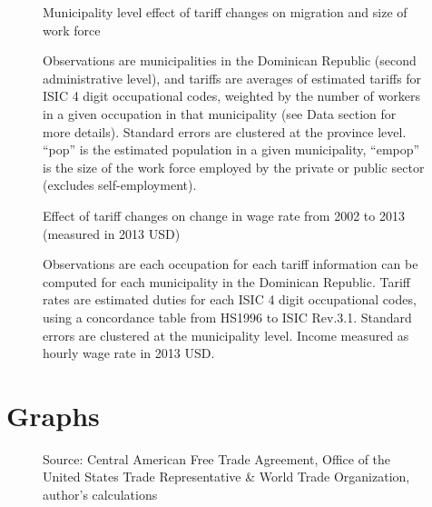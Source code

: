 \documentclass[12pt]{article}
\begin{document}
\begin{figure}[H]
\begin{center}
Municipality level effect of tariff changes on migration and size of work force

\caption{\label{fig:Table3}}
\end{center}
Observations are municipalities in the Dominican Republic (second administrative level),
and tariffs are averages of estimated tariffs for ISIC 4 %
digit occupational codes,
weighted by the number of workers in a given occupation in that municipality 
(see Data section for more details). Standard errors are clustered at the province level.
``pop'' is the estimated population in a given municipality, ``empop'' is the size of
the work force employed by the private or public sector (excludes self-employment).
\end{figure}

\begin{landscape}
\begin{figure}[H]
\begin{center}
Effect of tariff changes on change in wage rate from 2002 to 2013 (measured in 2013 USD)

\caption{\label{fig:Table2}}
\end{center}
Observations are each occupation for each tariff information can be computed for each municipality 
in the Dominican Republic. Tariff rates are estimated duties for each ISIC 4 %
digit occupational codes,
using a concordance table from HS1996 to ISIC Rev.3.1. Standard errors are clustered at the 
municipality level. Income measured as hourly wage rate in 2013 USD.
\end{figure}
\end{landscape}

\section{Graphs}
\label{sec:Graphs}

\begin{figure}[H]
% 
\caption{\label{fig:Graph1}}
Source: Central American Free Trade Agreement, Office of the United States Trade Representative \&
World Trade Organization, author's calculations
\end{figure}
\end{document}
